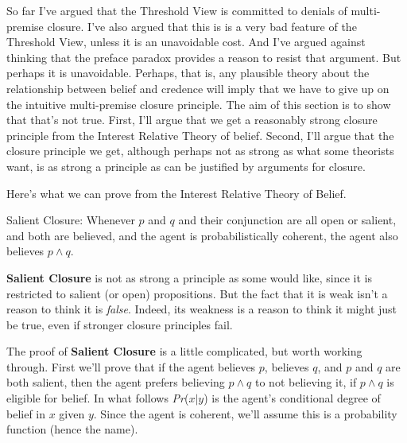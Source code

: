 So far I've argued that the Threshold View is committed to denials of multi-premise closure. I've also argued that this is is a very bad feature of the Threshold View, unless it is an unavoidable cost. And I've argued against thinking that the preface paradox provides a reason to resist that argument. But perhaps it is unavoidable. Perhaps, that is, any plausible theory about the relationship between belief and credence will imply that we have to give up on the intuitive multi-premise closure principle. The aim of this section is to show that that's not true. First, I'll argue that we get a reasonably strong closure principle from the Interest Relative Theory of belief. Second, I'll argue that the closure principle we get, although perhaps not as strong as what some theorists want, is as strong a principle as can be justified by arguments for closure.

Here's what we can prove from the Interest Relative Theory of Belief.

\begin{description*}
\item[Salient Closure:] Whenever \(p\) and \(q\) and their conjunction are all open or salient, and both are believed, and the agent is probabilistically coherent, the agent also believes \(p \wedge q\). 
\end{description*}

\noindent \textbf{Salient Closure} is not as strong a principle as some would like, since it is restricted to salient (or open) propositions. But the fact that it is weak isn't a reason to think it is \textit{false}. Indeed, its weakness is a reason to think it might just be true, even if stronger closure principles fail.

The proof of \textbf{Salient Closure} is a little complicated, but worth working through. First we'll prove that if the agent believes \(p\), believes \(q\), and \(p\) and \(q\) are both salient, then the agent prefers believing \(p \wedge q\) to not believing it, if \(p \wedge q\) is eligible for belief. In what follows \textit{Pr}(\(x | y\)) is the agent's conditional degree of belief in \(x\) given \(y\). Since the agent is coherent, we'll assume this is a probability function (hence the name).

